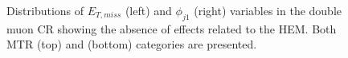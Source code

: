 \begin{figure}[htbp]
{    }
  \caption{Distributions of $E_{T,miss}$ (left) and $\phi_{j1}$ (right) variables in the double muon CR showing the absence of effects related to the HEM. Both MTR (top) and (bottom) categories are presented.}
  \label{fig:Zmumu_noHEM}
\end{figure}